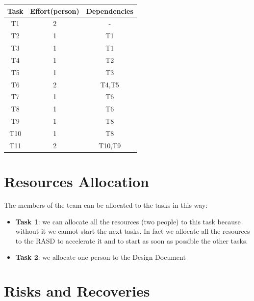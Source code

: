 \documentclass[18pt,oneside,a4paper, titlepage]{article}
\begin{document}
	\begin{center}
		\centering
		\begin{tabular}{|c |c |c |}
			\hline \textbf{Task} & \textbf{Effort(person)} & \textbf{Dependencies} \\
			\hline		T1 & 2 & -\\
			\hline		T2 & 1 & T1\\
			\hline		T3 & 1 & T1\\
			\hline		T4 & 1 & T2\\
			\hline		T5 & 1 & T3\\
			\hline		T6 & 2 & T4,T5\\
			\hline		T7 & 1 & T6\\
			\hline		T8 & 1 & T6\\
			\hline		T9 & 1 & T8\\
			\hline		T10 & 1 & T8\\
			\hline		T11 & 2 & T10,T9\\
			\hline
		\end{tabular}
	\end{center}
	
\newpage
\section{Resources Allocation}
	The members of the team can be allocated to the tasks in this way:
	\begin{itemize}
		\item \textbf{Task 1}: we can allocate all the resources (two people) to this task because without it we cannot start the next tasks. In fact we allocate all the resources to the RASD to accelerate it and to start as soon as possible the other tasks.
		\item \textbf{Task 2}: we allocate one person to the Design Document
	\end{itemize}

\newpage
\section{Risks and Recoveries}
\end{document}
